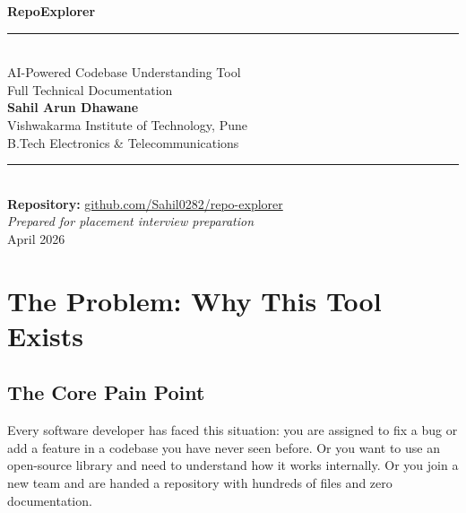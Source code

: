 \documentclass[a4paper,11pt]{article}
\begin{document}
\begin{titlepage}
    \centering
    \vspace*{2.5cm}

    {\fontsize{42}{50}\selectfont\bfseries\color{primaryblue} RepoExplorer}\\[0.6cm]
    \textcolor{accentblue}{\rule{0.6\linewidth}{1.5pt}}\\[0.8cm]

    {\Large\color{darkgray} AI-Powered Codebase Understanding Tool}\\[0.4cm]
    {\normalsize\color{medgray} Full Technical Documentation}\\[2.5cm]

    {\large\bfseries\color{darkgray} Sahil Arun Dhawane}\\[0.25cm]
    {\normalsize Vishwakarma Institute of Technology, Pune}\\[0.15cm]
    {\normalsize B.Tech Electronics \& Telecommunications}\\[2.5cm]

    \textcolor{medgray}{\rule{0.4\linewidth}{0.4pt}}\\[0.5cm]
    {\small \textbf{Repository:} \href{https://github.com/Sahil0282/repo-explorer}{github.com/Sahil0282/repo-explorer}}\\[1cm]
    {\small\itshape Prepared for placement interview preparation}\\[0.4cm]
    {\small April 2026}

    \vfill
\end{titlepage}

\tableofcontents
\newpage

\section{The Problem: Why This Tool Exists}

\subsection{The Core Pain Point}

Every software developer has faced this situation: you are assigned to fix a bug or add a feature in a codebase you have never seen before. Or you want to use an open-source library and need to understand how it works internally. Or you join a new team and are handed a repository with hundreds of files and zero documentation.
\end{document}
